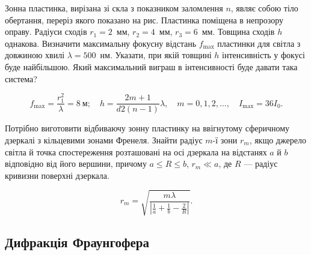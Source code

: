 \begin{problem}%
    Зонна пластинка, вирізана зі скла з показником заломлення $ n $, являє собою тіло обертання, переріз якого показано на рис. Пластинка поміщена в непрозору оправу. Радіуси сходів $r_1 = 2$~мм, $r_2 = 4$~мм,  $r_3 = 6$~мм. Товщина сходів $h$ однакова. Визначити максимальну фокусну відстань $f_{\max}$ пластинки для світла з довжиною хвилі $\lambda = 500$~нм. Указати, при якій товщині $h$ інтенсивність у фокусі буде найбільшою. Який максимальний виграш в інтенсивності буде давати така система?

    \begin{center}
        
    \end{center}

    \begin{solution}
        \begin{equation*}
            f_{\max} = \frac{r_1^2}{\lambda} = 8\ \text{м}; \quad h = \frac{2m+1}{d2(n - 1)}\lambda, \quad m = 0, 1, 2, \ldots, \quad I_{\max} = 36 I_0.
        \end{equation*}
    \end{solution}
\end{problem}


\begin{problem}%
    Потрібно виготовити відбиваючу зонну пластинку на ввігнутому
    сферичному дзеркалі з кільцевими зонами Френеля. Знайти радіус $ m $-ї
    зони $ r_m $, якщо джерело світла й точка спостереження розташовані на осі
    дзеркала на відстанях $ a $ й $ b $ відповідно від його вершини, причому $ a \le R \le b $, $ r_m \ll a $, де $ R $ --- радіус кривизни поверхні дзеркала.
    \begin{solution}
        \begin{equation*}
            r_m = \sqrt{\frac{m\lambda}{\left|\frac1a + \frac1b - \frac2R \right|}}.
        \end{equation*}
    \end{solution}
\end{problem}





\subsection*{Дифракція Фраунгофера}


